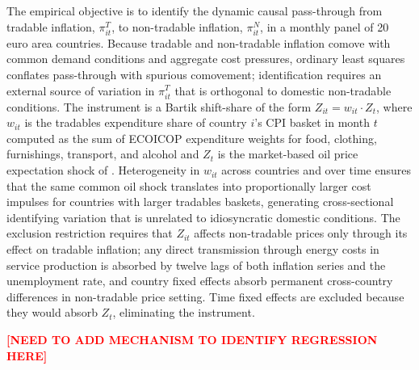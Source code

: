 \documentclass[a4paper,12pt]{article}
\begin{document}
The empirical objective is to identify the dynamic causal pass-through from tradable inflation, $\pi^T_{it}$, to non-tradable inflation, $\pi^N_{it}$, in a monthly panel of 20 euro area countries. Because tradable and non-tradable inflation comove with common demand conditions and aggregate cost pressures, ordinary least squares conflates pass-through with spurious comovement; identification requires an external source of variation in $\pi^T_{it}$ that is orthogonal to domestic non-tradable conditions. The instrument is a Bartik shift-share of the form $Z_{it} = w_{it} \cdot Z_t$, where $w_{it}$ is the tradables expenditure share of country $i$'s CPI basket in month $t$ computed as the sum of ECOICOP expenditure weights for food, clothing, furnishings, transport, and alcohol and $Z_t$ is the market-based oil price expectation shock of . Heterogeneity in $w_{it}$ across countries and over time ensures that the same common oil shock translates into proportionally larger cost impulses for countries with larger tradables baskets, generating cross-sectional identifying variation that is unrelated to idiosyncratic domestic conditions. The exclusion restriction requires that $Z_{it}$ affects non-tradable prices only through its effect on tradable inflation; any direct transmission through energy costs in service production is absorbed by twelve lags of both inflation series and the unemployment rate, and country fixed effects absorb permanent cross-country differences in non-tradable price setting. Time fixed effects are excluded because they would absorb $Z_t$, eliminating the instrument.

\begin{center}\textcolor{red}{\textbf{[NEED TO ADD MECHANISM TO IDENTIFY REGRESSION HERE]}} \end{center}
\end{document}
